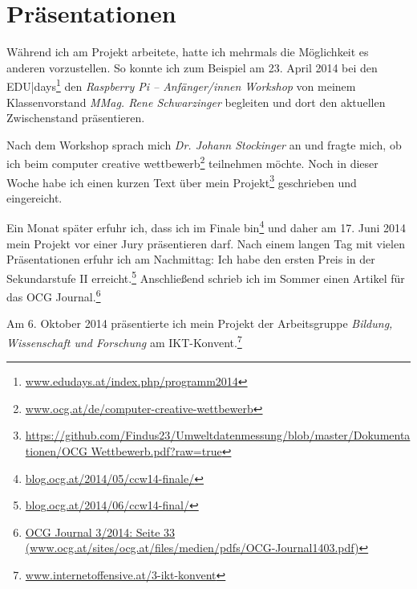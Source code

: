 \chapter{Präsentationen}

Während ich am Projekt arbeitete, hatte ich mehrmals die Möglichkeit es anderen vorzustellen. 
So konnte ich zum Beispiel am 23. April 2014 bei den \textsf{EDU|days}\footnote{\href{http://www.edudays.at/index.php/programm2014}{www.edudays.at/index.php/programm2014}} den \emph{Raspberry Pi -- Anfänger/innen Workshop} von meinem Klassenvorstand \emph{MMag. Rene Schwarzinger} begleiten und dort den aktuellen Zwischenstand präsentieren. 

Nach dem Workshop sprach mich \emph{Dr. Johann Stockinger} an und fragte mich, ob ich beim \textsf{computer creative wettbewerb}\footnote{\href{http://www.ocg.at/de/computer-creative-wettbewerb}{www.ocg.at/de/computer-creative-wettbewerb}}
teilnehmen möchte. Noch in dieser Woche habe ich einen kurzen Text über mein Projekt\footnote{\href{https://github.com/Findus23/Umweltdatenmessung/blob/master/Dokumentationen/OCG Wettbewerb.pdf?raw=true}{https://github.com/Findus23/Umweltdatenmessung/blob/master/Dokumentationen/OCG Wettbewerb.pdf?raw=true}}
geschrieben und eingereicht.

Ein Monat später erfuhr ich, dass ich im Finale bin\footnote{\href{http://blog.ocg.at/2014/05/ccw14-finale/}{blog.ocg.at/2014/05/ccw14-finale/}} und daher am 17. Juni 2014 mein Projekt vor einer Jury präsentieren darf. Nach einem langen Tag mit vielen Präsentationen erfuhr ich am Nachmittag: Ich habe den ersten Preis in der Sekundarstufe II erreicht.\footnote{\href{http://blog.ocg.at/2014/06/ccw14-final/}{blog.ocg.at/2014/06/ccw14-final/}}
Anschließend schrieb ich im Sommer einen Artikel für das OCG Journal.\footnote{\href{http://www.ocg.at/sites/ocg.at/files/medien/pdfs/OCG-Journal1403.pdf}{OCG Journal 3/2014: Seite 33 (www.ocg.at/sites/ocg.at/files/medien/pdfs/OCG-Journal1403.pdf)}}

Am 6. Oktober 2014 präsentierte ich mein Projekt der Arbeitsgruppe \textit{Bildung, Wissenschaft und Forschung} am \textsf{IKT-Konvent}.\footnote{\href{http://www.internetoffensive.at/3-ikt-konvent}{www.internetoffensive.at/3-ikt-konvent}}

